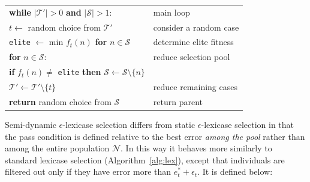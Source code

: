 \documentclass[twoside]{article}
\begin{document}
\begin{algorithm}
{\begin{tabularx}{\textwidth}{lX}
\hspace{1em}	\textbf{while} $|\mathcal{T}'| >0$ \textbf{and} $|\mathcal{S}|>1$:						&	main loop\\
\hspace{1em}\hspace{1em}	$t \leftarrow$ random choice from $\mathcal{T'}$  	&	\hspace{1em}consider a random case\\
\hspace{1em}\hspace{1em}	\texttt{elite} $\leftarrow$ min $f_t(n)$ \textbf{for} $n \in \mathcal{S}$ 	&	\hspace{1em}determine elite fitness\\
\hspace{1em}\hspace{1em}	\textbf{for} $n \in \mathcal{S}$: 	&	\hspace{1em}reduce selection pool\\
\hspace{1em}\hspace{1em}\hspace{1em}	 \textbf{if} $f_t(n) \neq$ \texttt{elite} \textbf{then}	$\mathcal{S} \leftarrow \mathcal{S} \setminus \{n\}$			&	\\
\hspace{1em}\hspace{1em}	$\mathcal{T'} \leftarrow \mathcal{T'} \setminus \{t\}$ 				&	\hspace{1em}reduce remaining cases\\
\hspace{1em} \textbf{return} random choice from $\mathcal{S}$															&	return parent  
\end{tabularx}
}
\end{algorithm}

Semi-dynamic $\epsilon$-lexicase selection differs from static $\epsilon$-lexicase selection in that the pass condition is defined relative to the best error {\it among the pool} rather than among the entire population $\mathcal{N}$. In this way it behaves more similarly to standard lexicase selection (Algorithm~\ref{alg:lex}), except that individuals are filtered out only if they have error more than $e^*_t + \epsilon_t$. It is defined below:
\end{document}
